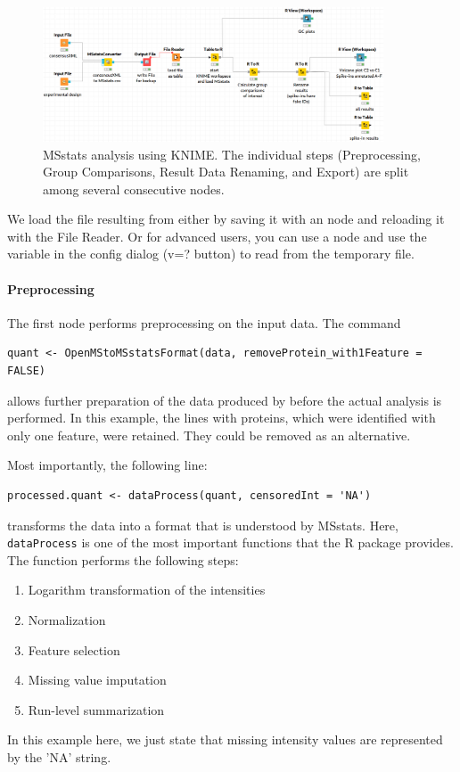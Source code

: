 \begin{figure}[htbp]
	\centering
	\includegraphics[width=0.9\textwidth]{graphics/labelfree/msstats/MSstats.png}
	\caption{MSstats analysis using KNIME. The individual steps (Preprocessing,
	Group Comparisons, Result Data Renaming, and Export) are split among several consecutive nodes.}
	\label{fig:msstats_workflow}
\end{figure}

We load the file resulting from  either by saving it with an  node and reloading it with the File Reader. Or for advanced users,
you can use a  node and use the variable in the  config dialog (v=? button) to read from the temporary file.

\paragraph{Preprocessing}
The first  node performs preprocessing on the input data. The command
\begin{lstlisting}
quant <- OpenMStoMSstatsFormat(data, removeProtein_with1Feature = FALSE)
\end{lstlisting}
allows further preparation of the data produced by  before the actual analysis is performed. In this example, the 
lines with proteins, which were identified with only one feature, were retained. They could be removed as an alternative.

Most importantly, the following line:
\begin{lstlisting}
processed.quant <- dataProcess(quant, censoredInt = 'NA')
\end{lstlisting}
transforms the data into a format that is understood by MSstats.
Here, \texttt{dataProcess} is one of the most important functions that the
R package provides. The function performs the following steps:
\begin{enumerate}
	\item
	Logarithm transformation of the intensities
	\item
	Normalization
	\item
	Feature selection
	\item
	Missing value imputation
	\item
	Run-level summarization
\end{enumerate}
In this example here, we just state that missing intensity values are represented by the 'NA' string. 


